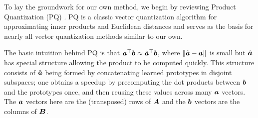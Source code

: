 


To lay the groundwork for our own method, we begin by reviewing Product Quantization (PQ) \cite{pq}. PQ is a classic vector quantization algorithm for approximating inner products and Euclidean distances and serves as the basis for nearly all vector quantization methods similar to our own. %


The basic intuition behind PQ is that $\bm{a}^\top \bm{b} \approx \hat{\bm{a}}^\top \bm{b}$, where $\lVert\hat{\bm{a}} - \bm{a}\rVert$ is small but $\hat{\bm{a}}$ has special structure allowing the product to be computed quickly. This structure consists of $\hat{\bm{a}}$ being formed by concatenating learned prototypes in disjoint subspaces; one obtains a speedup by precomputing the dot products between $\bm{b}$ and the prototypes once, and then reusing these values across many $\bm{a}$ vectors. The $\bm{a}$ vectors here are the (transposed) rows of $\bm{A}$ and the $\bm{b}$ vectors are the columns of $\bm{B}$.

